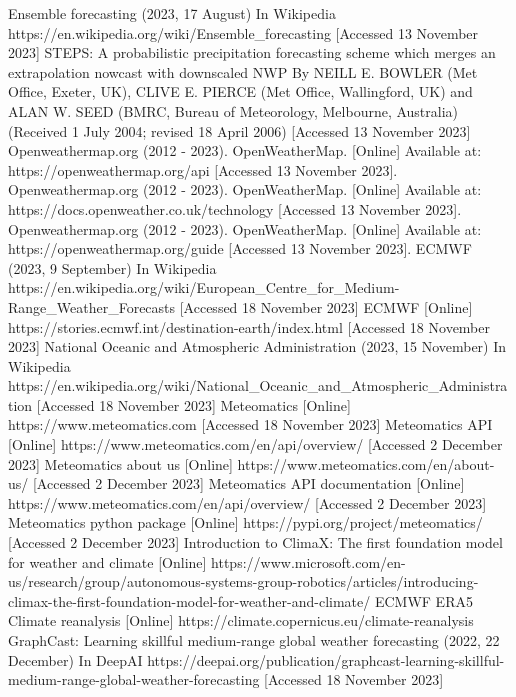 \documentclass[../paper.tex]{subfiles}
\begin{document}
\begin{thebibliography}{00}
     Ensemble forecasting (2023, 17 August) In Wikipedia https://en.wikipedia.org/wiki/Ensemble\_forecasting [Accessed 13 November 2023]
     STEPS:
    A probabilistic precipitation forecasting scheme which merges an extrapolation nowcast with downscaled NWP
    By NEILL E. BOWLER (Met Office, Exeter, UK), CLIVE E. PIERCE (Met Office, Wallingford, UK) and ALAN W. SEED (BMRC,
    Bureau of Meteorology, Melbourne, Australia)
    (Received 1 July 2004; revised 18 April 2006) [Accessed 13 November 2023]
     Openweathermap.org (2012 - 2023).
    OpenWeatherMap.
    [Online] Available at: https://openweathermap.org/api [Accessed 13 November 2023].
     Openweathermap.org (2012 - 2023).
    OpenWeatherMap.
    [Online] Available at: https://docs.openweather.co.uk/technology [Accessed 13 November 2023].
     Openweathermap.org (2012 - 2023).
    OpenWeatherMap.
    [Online] Available at: https://openweathermap.org/guide [Accessed 13 November 2023].
     ECMWF (2023, 9 September) In Wikipedia https://en.wikipedia.org/wiki/European\_Centre\_for\_Medium-Range\_Weather\_Forecasts [Accessed 18 November 2023]
     ECMWF [Online] https://stories.ecmwf.int/destination-earth/index.html [Accessed 18 November 2023]
     National Oceanic and Atmospheric Administration (2023, 15 November) In Wikipedia
    https://en.wikipedia.org/wiki/National\_Oceanic\_and\_Atmospheric\_Administration [Accessed 18 November 2023]
     Meteomatics [Online] https://www.meteomatics.com [Accessed 18 November 2023]
     Meteomatics API [Online] https://www.meteomatics.com/en/api/overview/ [Accessed 2 December 2023]
     Meteomatics about us [Online] https://www.meteomatics.com/en/about-us/ [Accessed 2 December 2023]
     Meteomatics API documentation [Online] https://www.meteomatics.com/en/api/overview/ [Accessed 2 December 2023]
     Meteomatics python package [Online] https://pypi.org/project/meteomatics/ [Accessed 2 December 2023]
     Introduction to ClimaX: The first foundation model for weather and climate [Online] https://www.microsoft.com/en-us/research/group/autonomous-systems-group-robotics/articles/introducing-climax-the-first-foundation-model-for-weather-and-climate/
     ECMWF ERA5 Climate reanalysis [Online] https://climate.copernicus.eu/climate-reanalysis
     GraphCast: Learning skillful medium-range global weather forecasting (2022, 22 December) In DeepAI https://deepai.org/publication/graphcast-learning-skillful-medium-range-global-weather-forecasting [Accessed 18 November 2023]

\end{thebibliography}
\end{document}
